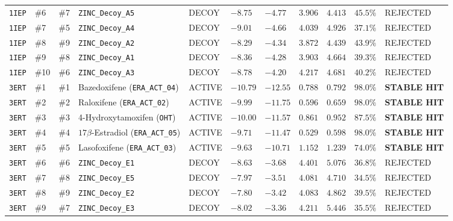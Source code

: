\documentclass[11pt,a4paper]{article}
\begin{document}
{\begin{longtable}{L{0.8cm} C{0.65cm} C{0.65cm} L{2.6cm} C{1.3cm} R{0.95cm} R{0.95cm} R{1.0cm} R{0.9cm} R{0.95cm} C{1.85cm}}
\texttt{1IEP} & \#6 & \#7 & \texttt{ZINC\_Decoy\_A5} & DECOY & $-8.75$ & $-4.77$ & $3.906$ & $4.413$ & $45.5\%$ & \textcolor{failred}{REJECTED} \\
\texttt{1IEP} & \#7 & \#5 & \texttt{ZINC\_Decoy\_A4} & DECOY & $-9.01$ & $-4.66$ & $4.039$ & $4.926$ & $37.1\%$ & \textcolor{failred}{REJECTED} \\
\texttt{1IEP} & \#8 & \#9 & \texttt{ZINC\_Decoy\_A2} & DECOY & $-8.29$ & $-4.34$ & $3.872$ & $4.439$ & $43.9\%$ & \textcolor{failred}{REJECTED} \\
\texttt{1IEP} & \#9 & \#8 & \texttt{ZINC\_Decoy\_A1} & DECOY & $-8.36$ & $-4.28$ & $3.903$ & $4.664$ & $39.3\%$ & \textcolor{failred}{REJECTED} \\
\texttt{1IEP} & \#10 & \#6 & \texttt{ZINC\_Decoy\_A3} & DECOY & $-8.78$ & $-4.20$ & $4.217$ & $4.681$ & $40.2\%$ & \textcolor{failred}{REJECTED} \\
\midrule
\texttt{3ERT} & \#1 & \#1 & Bazedoxifene (\texttt{ERA\_ACT\_04}) & ACTIVE & $-10.79$ & $-12.55$ & $0.788$ & $0.792$ & $98.0\%$ & \textcolor{passgreen}{\textbf{STABLE HIT}} \\
\texttt{3ERT} & \#2 & \#2 & Raloxifene (\texttt{ERA\_ACT\_02}) & ACTIVE & $-9.99$ & $-11.75$ & $0.596$ & $0.659$ & $98.0\%$ & \textcolor{passgreen}{\textbf{STABLE HIT}} \\
\texttt{3ERT} & \#3 & \#3 & 4-Hydroxytamoxifen (\texttt{OHT}) & ACTIVE & $-10.00$ & $-11.57$ & $0.861$ & $0.952$ & $87.5\%$ & \textcolor{passgreen}{\textbf{STABLE HIT}} \\
\texttt{3ERT} & \#4 & \#4 & $17\beta$-Estradiol (\texttt{ERA\_ACT\_05}) & ACTIVE & $-9.71$ & $-11.47$ & $0.529$ & $0.598$ & $98.0\%$ & \textcolor{passgreen}{\textbf{STABLE HIT}} \\
\texttt{3ERT} & \#5 & \#5 & Lasofoxifene (\texttt{ERA\_ACT\_03}) & ACTIVE & $-9.63$ & $-10.71$ & $1.152$ & $1.239$ & $74.0\%$ & \textcolor{passgreen}{\textbf{STABLE HIT}} \\
\texttt{3ERT} & \#6 & \#6 & \texttt{ZINC\_Decoy\_E1} & DECOY & $-8.63$ & $-3.68$ & $4.401$ & $5.076$ & $36.8\%$ & \textcolor{failred}{REJECTED} \\
\texttt{3ERT} & \#7 & \#8 & \texttt{ZINC\_Decoy\_E5} & DECOY & $-7.97$ & $-3.51$ & $4.081$ & $4.710$ & $34.5\%$ & \textcolor{failred}{REJECTED} \\
\texttt{3ERT} & \#8 & \#9 & \texttt{ZINC\_Decoy\_E2} & DECOY & $-7.80$ & $-3.42$ & $4.083$ & $4.862$ & $39.5\%$ & \textcolor{failred}{REJECTED} \\
\texttt{3ERT} & \#9 & \#7 & \texttt{ZINC\_Decoy\_E3} & DECOY & $-8.02$ & $-3.36$ & $4.211$ & $5.446$ & $35.5\%$ & \textcolor{failred}{REJECTED} \\

\end{longtable}}
\end{document}
